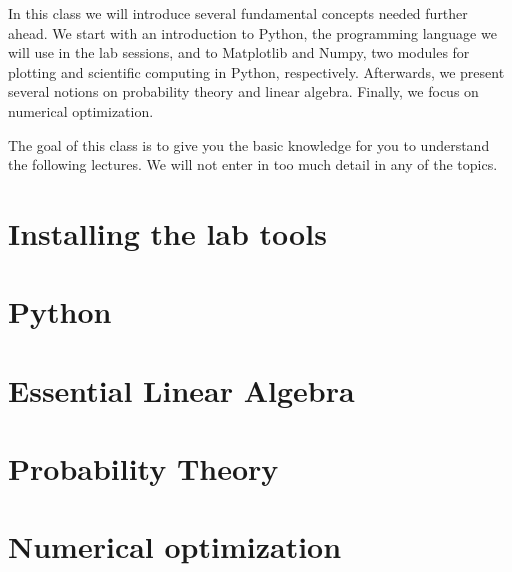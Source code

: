
In this class we will introduce several fundamental concepts needed further ahead. We start with an introduction to Python, the programming language we will use in the lab sessions, and to Matplotlib and Numpy, two modules for plotting and scientific computing in Python, respectively. Afterwards, we present several notions on probability theory and linear algebra. Finally, we focus on numerical optimization. 

The goal of this class is to give you the basic knowledge for you to understand the following lectures. We will not enter in too much detail in any of the topics. 

\section{Installing the lab tools}


\section{Python}


\section{Essential Linear Algebra}


\section{Probability Theory}


\section{Numerical optimization\label{numerical_optimization}}







